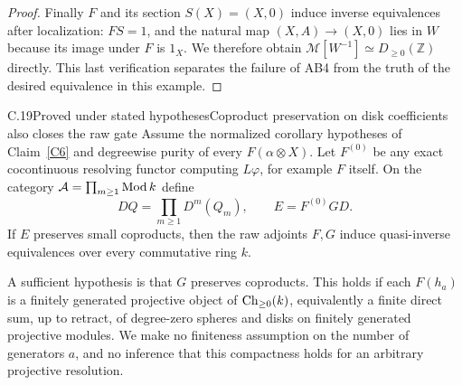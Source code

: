 \begin{proof}
Finally $F$ and its section $S(X)=(X,0)$ induce inverse equivalences after localization: $FS=1$, and the natural map $(X,A)\to(X,0)$ lies in $W$ because its image under $F$ is $1_X$. We therefore obtain $\mathcal M[W^{-1}]\simeq D_{\geq0}(\mathbb Z)$ directly. This last verification separates the failure of AB4 from the truth of the desired equivalence in this example.
\end{proof}


\begin{claim}{C.19}{Proved under stated hypotheses}{Coproduct preservation on disk coefficients also closes the raw gate}\label{C19}
Assume the normalized corollary hypotheses of Claim~\ref{C6} and degreewise purity of every $F(\alpha\otimes X)$. Let $F^{(0)}$ be any exact cocontinuous resolving functor computing $L\varphi$, for example $F$ itself. On the category $\mathcal A=\prod_{m\geq1}\operatorname{Mod} k$ define
\[
 DQ=\prod_{m\geq1}D^m(Q_m),\qquad E=F^{(0)}GD.
\]
If $E$ preserves small coproducts, then the raw adjoints $F,G$ induce quasi-inverse equivalences over every commutative ring $k$.

A sufficient hypothesis is that $G$ preserves coproducts. This holds if each $F(h_a)$ is a finitely generated projective object of $\operatorname{Ch}_{\geq0}(k)$, equivalently a finite direct sum, up to retract, of degree-zero spheres and disks on finitely generated projective modules. We make no finiteness assumption on the number of generators $a$, and no inference that this compactness holds for an arbitrary projective resolution.
\end{claim}
